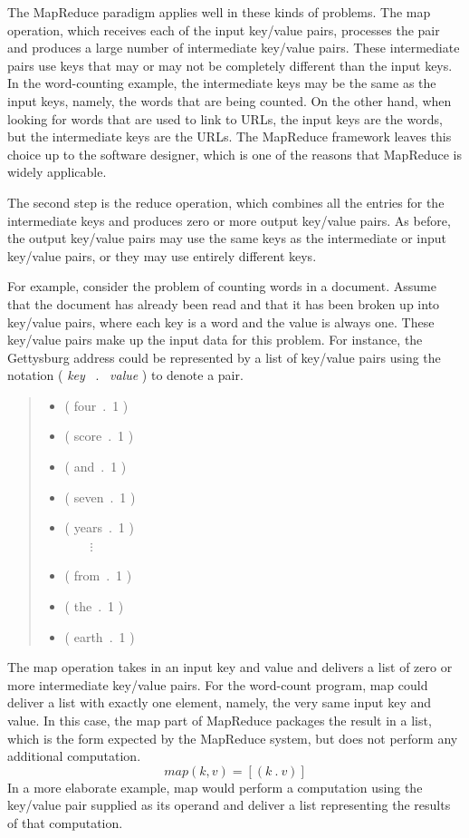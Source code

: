 The MapReduce paradigm applies well in these kinds of problems.
The \textsf{map} operation, which receives each
of the input key/value pairs, processes the
pair and produces a large number of intermediate
key/value pairs.  These intermediate pairs use keys that may
or may not be completely different than the input keys.
In the word-counting example, the intermediate keys may be the same
as the input keys, namely, the words that are being counted.
On the other hand, when looking for words that are used to
link to URLs, the input keys are the words, but the
intermediate keys are the URLs. The MapReduce framework leaves
this choice up to the software designer, which is
one of the reasons that MapReduce is widely applicable.

The second step is the \textsf{reduce}
operation, which combines all the entries
for the intermediate keys and
produces zero or more output key/value pairs.  As before, the
output key/value pairs may use the same keys as the
intermediate or input key/value pairs, or they may use
entirely different keys.

For example, consider the problem of counting words in a
document.  Assume that the document has already been
read and that it has been broken up into key/value pairs,
where each key is a word and the value is always one. These
key/value pairs make up the input data for this problem. For
instance, the Gettysburg address could be represented by a
list of key/value pairs using the notation ( \emph{key} ~.~ \emph{value} )
to denote a pair.
\begin{quote}
\begin{itemize}
\item \textsf{( four~.~1 )}
\item \textsf{( score~.~1 )}
\item \textsf{( and~.~1 )}
\item \textsf{( seven~.~1 )}
\item \textsf{( years~.~1 )}\\~~~~$\vdots$
\item \textsf{( from~.~1 )}
\item \textsf{( the~.~1 )}
\item \textsf{( earth~.~1 )}
\end{itemize}
\end{quote}

The \textsf{map} operation takes in an input key and
value and delivers a list of zero or more intermediate
key/value pairs.  For the word-count program, map could
deliver a list with exactly one element, namely,
the very same input key and value.
In this case, the map part of MapReduce
packages the result in a list, which is
the form expected by the MapReduce system,
but does not perform any additional computation.
\begin{displaymath}
map(k, v) = [ ( k ~.~ v ) ]
\end{displaymath}
In a more elaborate example, map would perform
a computation using the key/value pair supplied as
its operand and deliver a list representing the results
of that computation.

